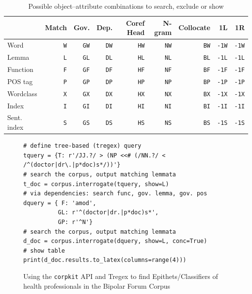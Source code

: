\begin{table}[htb]
\centering
\small
\begin{tabular}{lrrrrrrrr}
\toprule
{} & Match & Gov. & Dep. & Coref Head & N-gram & Collocate & 1L & 1R \\
\midrule
Word          &     \texttt{W} &       \texttt{GW} &        \texttt{DW} &        \texttt{HW} &     \texttt{NW} &        \texttt{BW} &        \texttt{-1W} &        \texttt{-1W} \\
Lemma          &     \texttt{L} &       \texttt{GL} &        \texttt{DL} &        \texttt{HL} &     \texttt{NL} &        \texttt{BL} &        \texttt{-1L} &        \texttt{-1L} \\
Function       &     \texttt{F} &       \texttt{GF} &        \texttt{DF} &        \texttt{HF} &     \texttt{NF} &        \texttt{BF} &        \texttt{-1F} &        \texttt{-1F} \\
POS tag         &     \texttt{P} &       \texttt{GP} &        \texttt{DP} &        \texttt{HP} &     \texttt{NP} &        \texttt{BP} &        \texttt{-1P} &        \texttt{-1P} \\
Wordclass      &     \texttt{X} &       \texttt{GX} &        \texttt{DX} &        \texttt{HX} &     \texttt{NX} &        \texttt{BX} &        \texttt{-1X} &        \texttt{-1X} \\
Index          &     \texttt{I} &       \texttt{GI} &        \texttt{DI} &        \texttt{HI} &     \texttt{NI} &        \texttt{BI} &        \texttt{-1I} &        \texttt{-1I} \\
Sent. index &     \texttt{S} &       \texttt{GS} &        \texttt{DS} &        \texttt{HS} &     \texttt{NS} &        \texttt{BS} &        \texttt{-1S} &        \texttt{-1S} \\
\bottomrule
\end{tabular}
\caption[Possible object--attribute combinations]{Possible object--attribute combinations to search, exclude or show}
\label{tab:search-exclude-show}
\end{table}


\begin{figure}[htb]
\begin{verbatim}
# define tree-based (tregex) query
tquery = {T: r'/JJ.?/ > (NP <<# (/NN.?/ < /^(doctor|dr\.|p*doc)s*/))'}
# search the corpus, output matching lemmata
t_doc = corpus.interrogate(tquery, show=L)
# via dependencies: search func, gov. lemma, gov. pos
dquery = { F: 'amod',
          GL: r'^(doctor|dr.|p*doc)s*',
          GP: r'^N'}
# search the corpus, output matching lemmata
d_doc = corpus.interrogate(dquery, show=L, conc=True)
# show table
print(d_doc.results.to_latex(columns=range(4)))
\end{verbatim}
\caption[Using the \texttt{corpkit} API]{Using the \texttt{corpkit} API and Tregex to find Epithets\slash Classifiers of health professionals in the Bipolar Forum Corpus}
\label{fig:mod-of-doc}
\end{figure}

